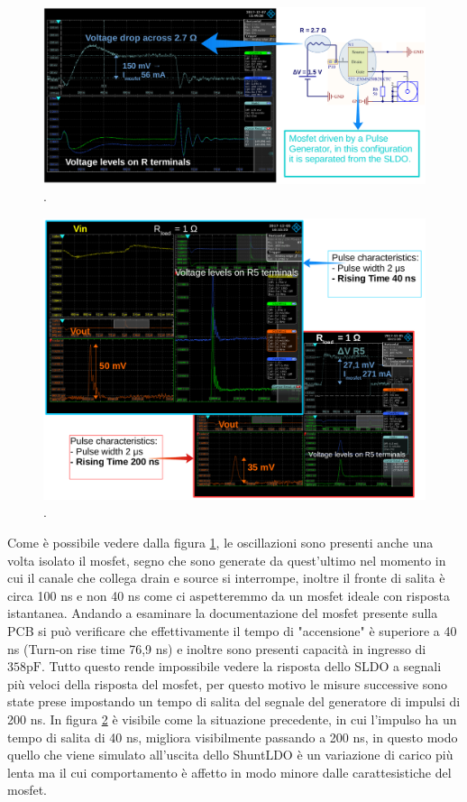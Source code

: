 \begin{figure}
\centering
\includegraphics[scale=.3]{Immagini/MosfetBehaviour}
\caption{.}
\label{MosfetBehaviour}
\end{figure}

\begin{figure}
\centering
\includegraphics[scale=.3]{Immagini/RiseTime}
\caption{.}
\label{RiseTime}
\end{figure}

Come è possibile vedere dalla figura \ref{MosfetBehaviour}, le oscillazioni sono presenti anche una volta isolato il mosfet, segno che sono generate da quest'ultimo nel momento in cui il canale che collega drain e source si interrompe, inoltre il fronte di salita è circa 100 ns e non 40 ns come ci aspetteremmo da un mosfet ideale con risposta istantanea. Andando a esaminare la documentazione del mosfet presente sulla PCB 
si può verificare che effettivamente il tempo di "accensione" è superiore a 40 ns (Turn-on rise time 76,9 ns) e inoltre sono presenti capacità in ingresso di $\mathrm{358 pF}$. Tutto questo rende impossibile vedere la risposta dello SLDO a segnali più veloci della risposta del mosfet, per questo motivo le misure successive sono state prese impostando un tempo di salita del segnale del generatore di impulsi di 200 ns.
In figura \ref{RiseTime} è visibile come la situazione precedente, in cui l'impulso ha un tempo di salita di 40 ns, migliora visibilmente passando a 200 ns, in questo modo quello che viene simulato all'uscita dello ShuntLDO è un variazione di carico più lenta ma il cui comportamento è affetto in modo minore dalle carattesistiche del mosfet. 

